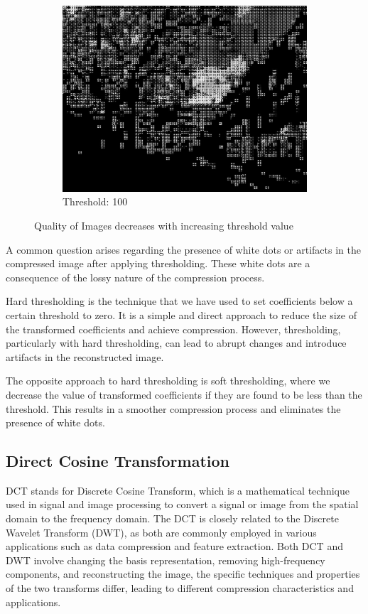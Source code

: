 \documentclass{article}
\begin{document}
\begin{figure}[htbp]
\begin{subfigure}{0.3\textwidth}
        \includegraphics[width=\linewidth]{RECONSTRUCTED100.jpeg}
        \caption{Threshold: 100}
    \end{subfigure}

    \caption{Quality of Images decreases with increasing threshold value}
\end{figure}

A common question arises regarding the presence of white dots or artifacts in the compressed image after applying thresholding. These white dots are a consequence of the lossy nature of the compression process.

Hard thresholding is the technique that we have used to set coefficients below a certain threshold to zero. It is a simple and direct approach to reduce the size of the transformed coefficients and achieve compression. However, thresholding, particularly with hard thresholding, can lead to abrupt changes and introduce artifacts in the reconstructed image.

The opposite approach to hard thresholding is soft thresholding, where we decrease the value of transformed coefficients if they are found to be less than the threshold. This results in a smoother compression process and eliminates the presence of white dots.
\newpage

\subsection{Direct Cosine Transformation}

\setlength{\parindent}{1cm}
DCT stands for Discrete Cosine Transform, which is a mathematical technique used in signal and image processing to convert a signal or image from the spatial domain to the frequency domain. The DCT is closely related to the Discrete Wavelet Transform (DWT), as both are commonly employed in various applications such as data compression and feature extraction.
Both DCT and DWT involve changing the basis representation, removing high-frequency components, and reconstructing the image, the specific techniques and properties of the two transforms differ, leading to different compression characteristics and applications.
\end{document}
